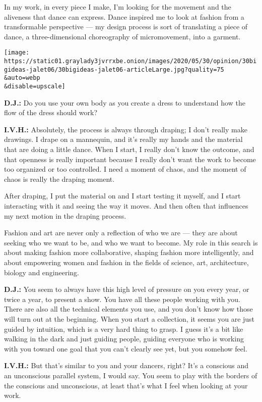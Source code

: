 In my work, in every piece I make, I'm looking for the movement and the
aliveness that dance can express. Dance inspired me to look at fashion
from a transformable perspective --- my design process is sort of
translating a piece of dance, a three-dimensional choreography of
micromovement, into a garment.

\texttt{[image: https://static01.graylady3jvrrxbe.onion/images/2020/05/30/opinion/30bigideas-jalet06/30bigideas-jalet06-articleLarge.jpg?quality=75\\\&auto=webp\\\&disable=upscale]}

\textbf{D.J.:} Do you use your own body as you create a dress to
understand how the flow of the dress should work?

\textbf{I.V.H.:} Absolutely, the process is always through draping; I
don't really make drawings. I drape on a mannequin, and it's really my
hands and the material that are doing a little dance. When I start, I
really don't know the outcome, and that openness is really important
because I really don't want the work to become too organized or too
controlled. I need a moment of chaos, and the moment of chaos is really
the draping moment.

After draping, I put the material on and I start testing it myself, and
I start interacting with it and seeing the way it moves. And then often
that influences my next motion in the draping process.

Fashion and art are never only a reflection of who we are --- they are
about seeking who we want to be, and who we want to become. My role in
this search is about making fashion more collaborative, shaping fashion
more intelligently, and about empowering women and fashion in the fields
of science, art, architecture, biology and engineering.

\textbf{D.J.:} You seem to always have this high level of pressure on
you every year, or twice a year, to present a show. You have all these
people working with you. There are also all the technical elements you
use, and you don't know how those will turn out at the beginning. When
you start a collection, it seems you are just guided by intuition, which
is a very hard thing to grasp. I guess it's a bit like walking in the
dark and just guiding people, guiding everyone who is working with you
toward one goal that you can't clearly see yet, but you somehow feel.

\textbf{I.V.H.:} But that's similar to you and your dancers, right? It's
a conscious and an unconscious parallel system, I would say. You seem to
play with the borders of the conscious and unconscious, at least that's
what I feel when looking at your work.

